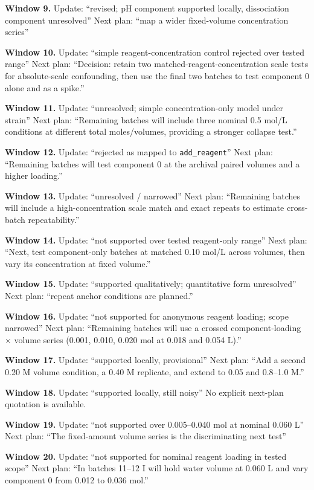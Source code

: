 \documentclass[10pt,a4paper]{article}
\begin{document}
\textbf{Window 9.} Update: ``revised; pH component supported locally, dissociation component unresolved'' Next plan: ``map a wider fixed-volume concentration series''

\textbf{Window 10.} Update: ``simple reagent-concentration control rejected over tested range'' Next plan: ``Decision: retain two matched-reagent-concentration scale tests for absolute-scale confounding, then use the final two batches to test component 0 alone and as a spike.''

\textbf{Window 11.} Update: ``unresolved; simple concentration-only model under strain'' Next plan: ``Remaining batches will include three nominal 0.5 mol/L conditions at different total moles/volumes, providing a stronger collapse test.''

\textbf{Window 12.} Update: ``rejected as mapped to \texttt{add\_reagent}'' Next plan: ``Remaining batches will test component 0 at the archival paired volumes and a higher loading.''

\textbf{Window 13.} Update: ``unresolved / narrowed'' Next plan: ``Remaining batches will include a high-concentration scale match and exact repeats to estimate cross-batch repeatability.''

\textbf{Window 14.} Update: ``not supported over tested reagent-only range'' Next plan: ``Next, test component-only batches at matched 0.10 mol/L across volumes, then vary its concentration at fixed volume.''

\textbf{Window 15.} Update: ``supported qualitatively; quantitative form unresolved'' Next plan: ``repeat anchor conditions are planned.''

\textbf{Window 16.} Update: ``not supported for anonymous reagent loading; scope narrowed'' Next plan: ``Remaining batches will use a crossed component-loading × volume series (0.001, 0.010, 0.020 mol at 0.018 and 0.054 L).''

\textbf{Window 17.} Update: ``supported locally, provisional'' Next plan: ``Add a second 0.20 M volume condition, a 0.40 M replicate, and extend to 0.05 and 0.8--1.0 M.''

\textbf{Window 18.} Update: ``supported locally, still noisy'' No explicit next-plan quotation is available.

\textbf{Window 19.} Update: ``not supported over 0.005--0.040 mol at nominal 0.060 L'' Next plan: ``The fixed-amount volume series is the discriminating next test''

\textbf{Window 20.} Update: ``not supported for nominal reagent loading in tested scope'' Next plan: ``In batches 11--12 I will hold water volume at 0.060 L and vary component 0 from 0.012 to 0.036 mol.''
\end{document}
